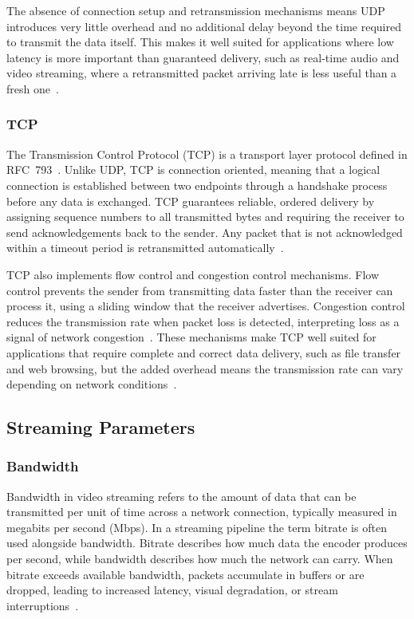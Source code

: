 The absence of connection setup and retransmission mechanisms means UDP introduces very little overhead and no additional delay beyond the time required to transmit the data itself. This makes it well suited for applications where low latency is more important than guaranteed delivery, such as real-time audio and video streaming, where a retransmitted packet arriving late is less useful than a fresh one~\cite{forouzan2012}.

\subsubsection{TCP}\label{subsubsec:tcp}
The Transmission Control Protocol (TCP) is a transport layer protocol defined in RFC~793~\cite{rfc793}. Unlike UDP, TCP is connection oriented, meaning that a logical connection is established between two endpoints through a handshake process before any data is exchanged. TCP guarantees reliable, ordered delivery by assigning sequence numbers to all transmitted bytes and requiring the receiver to send acknowledgements back to the sender. Any packet that is not acknowledged within a timeout period is retransmitted automatically~\cite{rfc793}.
 
TCP also implements flow control and congestion control mechanisms. Flow control prevents the sender from transmitting data faster than the receiver can process it, using a sliding window that the receiver advertises. Congestion control reduces the transmission rate when packet loss is detected, interpreting loss as a signal of network congestion~\cite{forouzan2012}. These mechanisms make TCP well suited for applications that require complete and correct data delivery, such as file transfer and web browsing, but the added overhead means the transmission rate can vary depending on network conditions~\cite{forouzan2012}.

\vspace{5mm}
\subsection{Streaming Parameters}\label{subsec:streaming-params}
\subsubsection{Bandwidth}\label{subsubsec:bandwidth}
Bandwidth in video streaming refers to the amount of data that can be transmitted per unit of time across a network connection, typically measured in megabits per second (Mbps). In a streaming pipeline the term bitrate is often used alongside bandwidth. Bitrate describes how much data the encoder produces per second, while bandwidth describes how much the network can carry. When bitrate exceeds available bandwidth, packets accumulate in buffers or are dropped, leading to increased latency, visual degradation, or stream interruptions~\cite{sodagar2011}.
 

